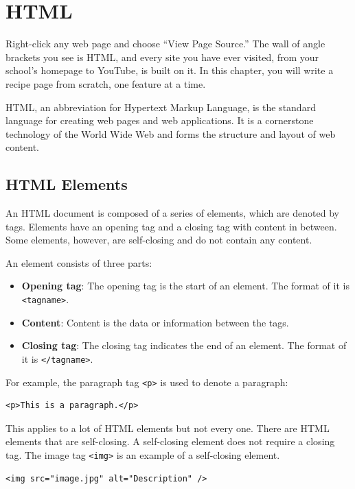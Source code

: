 \chapter{HTML}

Right-click any web page and choose ``View Page Source.'' The wall of
angle brackets you see is HTML, and every site you have ever visited, from
your school's homepage to YouTube, is built on it. In this chapter, you
will write a recipe page from scratch, one feature at a time.

HTML, an abbreviation for Hypertext Markup Language, is the standard
language for creating web pages and web applications. It is a
cornerstone technology of the World Wide Web and forms the structure
and layout of web content.

\section{HTML Elements}
An HTML document is composed of a series of elements, which are
denoted by tags. Elements have an opening tag and a closing tag with
content in between. Some elements, however, are self-closing and do
not contain any content.

An element consists of three parts:
\begin{itemize}
    \item \textbf{Opening tag}: The opening tag is the start of an element. The format of it is \verb|<tagname>|.
    \item \textbf{Content}: Content is the data or information between the tags.
    \item \textbf{Closing tag}: The closing tag indicates the end of an element. The format of it is \verb|</tagname>|.
\end{itemize}

For example, the paragraph tag \verb|<p>| is used to denote a paragraph:

\begin{verbatim}
<p>This is a paragraph.</p>
\end{verbatim}

This applies to a lot of HTML elements but not every one. There are HTML elements that are self-closing. A self-closing element 
does not require a closing tag. The image tag \verb|<img>| is an example of a self-closing element.

\begin{verbatim}
<img src="image.jpg" alt="Description" />
\end{verbatim}

